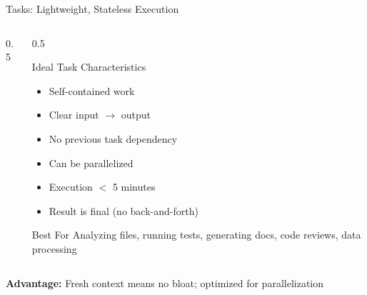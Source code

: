\documentclass[aspectratio=169,11pt]{beamer}
\begin{document}
\begin{frame}{Tasks: Lightweight, Stateless Execution}
\begin{columns}[T]
\begin{column}{0.5\textwidth}
\begin{center}
\end{center}
\end{column}
\begin{column}{0.5\textwidth}
\begin{block}{Ideal Task Characteristics}
\begin{itemize}
    \item Self-contained work
    \item Clear input $\rightarrow$ output
    \item No previous task dependency
    \item Can be parallelized
    \item Execution $<$ 5 minutes
    \item Result is final (no back-and-forth)
\end{itemize}
\end{block}

\begin{exampleblock}{Best For}
Analyzing files, running tests, generating docs, code reviews, data processing
\end{exampleblock}
\end{column}
\end{columns}

\vspace{0.2cm}
\textbf{Advantage:} Fresh context means no bloat; optimized for parallelization
\end{frame}
\end{document}
